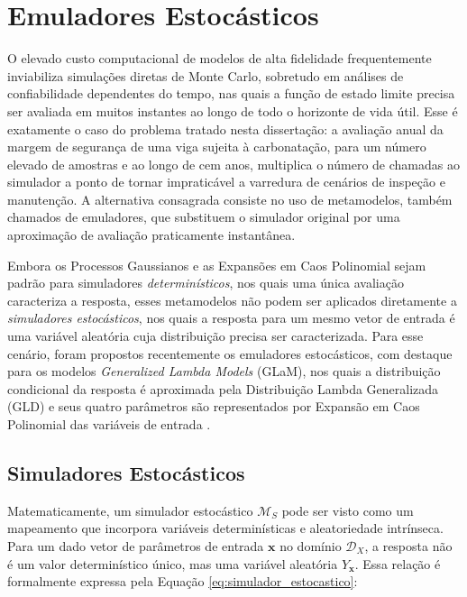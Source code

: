 \section{Emuladores Estocásticos} \label{EMU}

O elevado custo computacional de modelos de alta fidelidade frequentemente inviabiliza simulações diretas de Monte Carlo, sobretudo em análises de confiabilidade dependentes do tempo, nas quais a função de estado limite precisa ser avaliada em muitos instantes ao longo de todo o horizonte de vida útil. Esse é exatamente o caso do problema tratado nesta dissertação: a avaliação anual da margem de segurança de uma viga sujeita à carbonatação, para um número elevado de amostras e ao longo de cem anos, multiplica o número de chamadas ao simulador a ponto de tornar impraticável a varredura de cenários de inspeção e manutenção. A alternativa consagrada consiste no uso de metamodelos, também chamados de emuladores, que substituem o simulador original por uma aproximação de avaliação praticamente instantânea.

Embora os Processos Gaussianos \cite{rasmussen2006} e as Expansões em Caos Polinomial \cite{xiu2002} sejam padrão para simuladores \textit{determinísticos}, nos quais uma única avaliação caracteriza a resposta, esses metamodelos não podem ser aplicados diretamente a \textit{simuladores estocásticos}, nos quais a resposta para um mesmo vetor de entrada é uma variável aleatória cuja distribuição precisa ser caracterizada. Para esse cenário, foram propostos recentemente os emuladores estocásticos, com destaque para os modelos \textit{Generalized Lambda Models} (GLaM), nos quais a distribuição condicional da resposta é aproximada pela Distribuição Lambda Generalizada (GLD) e seus quatro parâmetros são representados por Expansão em Caos Polinomial das variáveis de entrada \cite{ZhuSudret2020, ZhuSudret2021}.

\subsection{Simuladores Estocásticos}

Matematicamente, um simulador estocástico $\mathcal{M}_S$ pode ser visto como um mapeamento que incorpora variáveis determinísticas e aleatoriedade intrínseca. Para um dado vetor de parâmetros de entrada $\mathbf{x}$ no domínio $\mathcal{D}_X$, a resposta não é um valor determinístico único, mas uma variável aleatória $Y_{\mathbf{x}}$. Essa relação é formalmente expressa pela Equação \eqref{eq:simulador_estocastico}:

